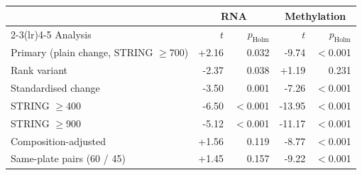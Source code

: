 \begin{tabular}{lrrrr}
\toprule
 & \multicolumn{2}{c}{RNA} & \multicolumn{2}{c}{Methylation} \\
\cmidrule(lr){2-3}\cmidrule(lr){4-5}
Analysis & $t$ & $p_{\mathrm{Holm}}$ & $t$ & $p_{\mathrm{Holm}}$ \\
\midrule
Primary (plain change, STRING $\ge$700) & +2.16 & 0.032 & -9.74 & $<$0.001 \\
Rank variant & -2.37 & 0.038 & +1.19 & 0.231 \\
Standardised change & -3.50 & 0.001 & -7.26 & $<$0.001 \\
STRING $\ge$400 & -6.50 & $<$0.001 & -13.95 & $<$0.001 \\
STRING $\ge$900 & -5.12 & $<$0.001 & -11.17 & $<$0.001 \\
Composition-adjusted & +1.56 & 0.119 & -8.77 & $<$0.001 \\
Same-plate pairs (60 / 45) & +1.45 & 0.157 & -9.22 & $<$0.001 \\
\bottomrule
\end{tabular}
